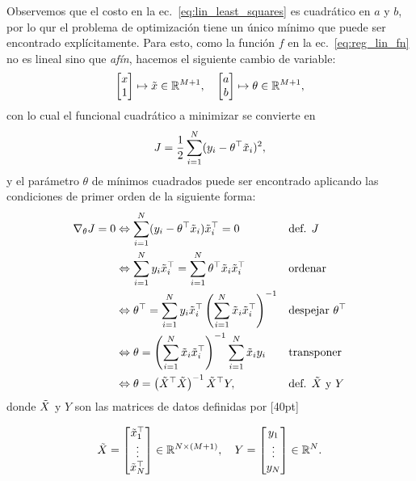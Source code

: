 Observemos que el costo en la  ec.~\eqref{eq:lin_least_squares} es cuadrático en $a$ y $b$, por lo qur  el problema de optimización tiene un único mínimo que puede ser encontrado explícitamente. Para esto, como la función $f$ en la ec.~\eqref{eq:reg_lin_fn} no es lineal sino que \emph{afín}, hacemos el siguiente cambio de variable:
\begin{equation}
  \left[ \begin{matrix}x \\  1\end{matrix}\right] \mapsto \tilde{x}\in{\mathbb R}^{M+1},\quad
  \left[ \begin{matrix}a \\  b\end{matrix}\right]\mapsto \theta\in{\mathbb R}^{M+1},
 \label{eq:truco_reg_lin} 
\end{equation}
con lo cual el funcional cuadrático a minimizar se convierte en
\begin{equation}
	J = \frac{1}{2}\sum_{i=1}^N(y_i-\theta^
	\top \tilde{x}_i)^2,
	\label{eq:lin_least_squares2}
\end{equation} 
y el parámetro $\theta$ de mínimos cuadrados puede ser encontrado aplicando las condiciones de primer orden de la siguiente forma:
\begin{align}
\nabla_\theta J=0 &\Leftrightarrow \sum_{i=1}^N(y_i-\theta^\top \tilde{x}_i)\tilde{x}_i^\top=0  							&&\text{def. $J$}\nonumber\\  
&\Leftrightarrow \sum_{i=1}^Ny_i\tilde{x}_i^\top = \sum_{i=1}^N\theta^\top \tilde{x}_i\tilde{x}_i^\top					&&\text{ordenar}\nonumber\\
&\Leftrightarrow \theta^\top = \sum_{i=1}^Ny_i\tilde{x}_i^\top \left(\sum_{i=1}^N \tilde{x}_i\tilde{x}_i^\top\right)^{-1}	&&\text{despejar $\theta^\top$}\nonumber\\
&\Leftrightarrow \theta =  \left(\sum_{i=1}^N \tilde{x}_i\tilde{x}_i^\top\right)^{-1} \sum_{i=1}^N \tilde{x}_i y_i 		&&\text{transponer}\nonumber\\
&\Leftrightarrow \theta = \left(\tilde{X}^\top\tilde{X} \right)^{-1} \tilde{X}^\top Y, 											&&\text{def. $\tilde{X}$ y $Y$} \label{eq:sol_mse}
\end{align}
donde $\tilde{X}$ y $Y$ son las matrices de datos definidas por [40pt]

\begin{equation}
  \tilde{X} = \left[ \begin{matrix}\tilde{x}_1^\top \\\vdots \\ \tilde{x}_N^\top \end{matrix}\right]\in{\mathbb R}^{N\times (M+1)} ,\quad
  Y = \left[ \begin{matrix}y_1 \\\vdots \\y_N \end{matrix}\right] \in{\mathbb R}^{N}.
 \label{eq:matrices_X} 
\end{equation}

